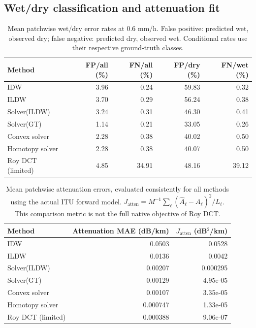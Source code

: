 \documentclass[a4paper,fleqn]{cas-sc}
\begin{document}
\subsection{Wet/dry classification and attenuation fit}
\begin{table}[!htbp]
\centering\small
\begin{tabular}{lrrrr}
\toprule
Method & FP/all (\%) & FN/all (\%) & FP/dry (\%) & FN/wet (\%) \\
\midrule
IDW & 3.96 & 0.24 & 59.83 & 0.32 \\
ILDW & 3.70 & 0.29 & 56.24 & 0.38 \\
Solver(ILDW) & 3.24 & 0.31 & 46.30 & 0.41 \\
Solver(GT) & 1.14 & 0.21 & 33.05 & 0.26 \\
Convex solver & 2.28 & 0.38 & 40.02 & 0.50 \\
Homotopy solver & 2.28 & 0.38 & 40.07 & 0.50 \\
Roy DCT (limited) & 4.85 & 34.91 & 48.16 & 39.12 \\
\bottomrule
\end{tabular}
\caption{Mean patchwise wet/dry error rates at 0.6 mm/h. False positive: predicted wet, observed dry; false negative: predicted dry, observed wet. Conditional rates use their respective ground-truth classes.}
\label{tab:wet-dry-confusion-merged}
\end{table}
\begin{table}[!htbp]
\centering\small
\begin{tabular}{lrr}
\toprule
Method & Attenuation MAE (dB/km) & $J_{\mathrm{atten}}$ (dB$^2$/km) \\
\midrule
IDW & 0.0503 & 0.0528 \\
ILDW & 0.0136 & 0.0042 \\
Solver(ILDW) & 0.00207 & 0.000295 \\
Solver(GT) & 0.00129 & 4.95e-05 \\
Convex solver & 0.00107 & 3.35e-05 \\
Homotopy solver & 0.000747 & 1.33e-05 \\
Roy DCT (limited) & 0.000388 & 9.06e-07 \\
\bottomrule
\end{tabular}
\caption{Mean patchwise attenuation errors, evaluated consistently for all methods using the actual ITU forward model. $J_{\mathrm{atten}}=M^{-1}\sum_\ell(\widehat A_\ell-A_\ell)^2/L_\ell$. This comparison metric is not the full native objective of Roy DCT.}
\label{tab:attenuation-fit-summary}
\end{table}
\end{document}
